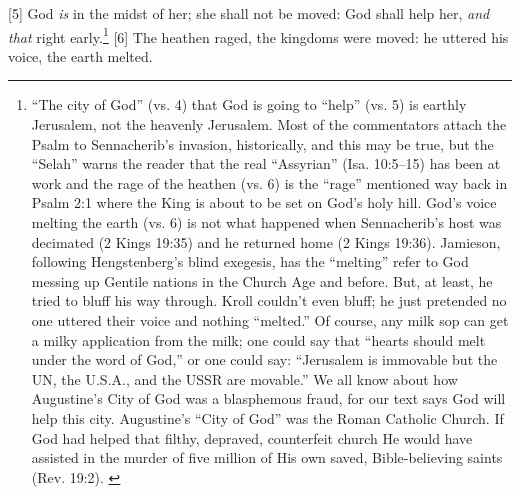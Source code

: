 [5] \textcolor[rgb]{0.00,0.00,1.00}{God \emph{is} in the midst of her; she shall not be moved: God shall help her, \emph{and} \emph{that} right early.}\footnote{“The city of God” (vs. 4) that God is going to “help” (vs. 5) is earthly Jerusalem, not the heavenly Jerusalem. Most of the commentators attach the Psalm to Sennacherib’s invasion, historically, and this may be true, but the “Selah” warns the reader that the real “Assyrian” (Isa. 10:5–15) has been at work and the rage of the heathen (vs. 6) is the “rage” mentioned way back in Psalm 2:1 where the King is about to be set on God’s holy hill. God’s voice melting the earth (vs. 6) is not what happened when Sennacherib’s host was decimated (2 Kings 19:35) and he returned home (2 Kings 19:36). Jamieson, following Hengstenberg’s blind exegesis, has the “melting” refer to God messing up Gentile nations in the Church Age and before. But, at least, he tried to bluff his way through. Kroll couldn’t even bluff; he just pretended no one uttered their voice and nothing “melted.” Of course, any milk sop can get a milky application from the milk; one could say that “hearts should melt under the word of God,” or one could say: “Jerusalem is immovable but the UN, the U.S.A., and the USSR are movable.” We all know about how Augustine’s City of God was a blasphemous fraud, for our text says God will help this city. Augustine’s “City of God” was the Roman Catholic Church. If God had helped that filthy, depraved, counterfeit church He would have assisted in the murder of five million of His own saved, Bible-believing saints (Rev. 19:2). \cite{Ruckman1992Psalms} }
[6] \textcolor[rgb]{0.00,0.00,1.00}{The heathen raged, the kingdoms were moved: he uttered his voice, the earth melted.}
